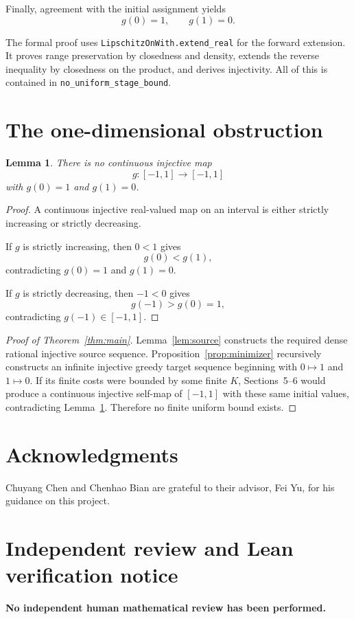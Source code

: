 \documentclass[11pt]{amsart}
\newtheorem{lemma}[theorem]{Lemma}
\theoremstyle{definition}
\theoremstyle{remark}
\begin{document}
Finally, agreement with the initial assignment yields
\[
g(0)=1,\qquad g(1)=0.
\]

The formal proof uses \texttt{LipschitzOnWith.extend\_real} for the forward extension.  It proves range preservation by closedness and density, extends the reverse inequality by closedness on the product, and derives injectivity.  All of this is contained in \texttt{no\_uniform\_stage\_bound}.

\section{The one-dimensional obstruction}

\begin{lemma}\label{lem:interval}
There is no continuous injective map
\[
g:[-1,1]\to[-1,1]
\]
with $g(0)=1$ and $g(1)=0$.
\end{lemma}

\begin{proof}
A continuous injective real-valued map on an interval is either strictly increasing or strictly decreasing.

If $g$ is strictly increasing, then $0<1$ gives
\[
g(0)<g(1),
\]
contradicting $g(0)=1$ and $g(1)=0$.

If $g$ is strictly decreasing, then $-1<0$ gives
\[
g(-1)>g(0)=1,
\]
contradicting $g(-1)\in[-1,1]$.
\end{proof}


\begin{proof}[Proof of Theorem~\ref{thm:main}]
Lemma~\ref{lem:source} constructs the required dense rational injective source sequence.  Proposition~\ref{prop:minimizer} recursively constructs an infinite injective greedy target sequence beginning with $0\mapsto1$ and $1\mapsto0$.  If its finite costs were bounded by some finite $K$, Sections~5--6 would produce a continuous injective self-map of $[-1,1]$ with these same initial values, contradicting Lemma~\ref{lem:interval}.  Therefore no finite uniform bound exists.
\end{proof}


\section*{Acknowledgments}
Chuyang Chen and Chenhao Bian are grateful to their advisor, Fei Yu, for his guidance on this project.

\section*{Independent review and Lean verification notice}
\begingroup
\small
\begin{center}
\begin{minipage}{0.94\linewidth}
\centering
\textbf{\large No independent human mathematical review has been performed.}
\end{minipage}
\end{center}
\end{document}
